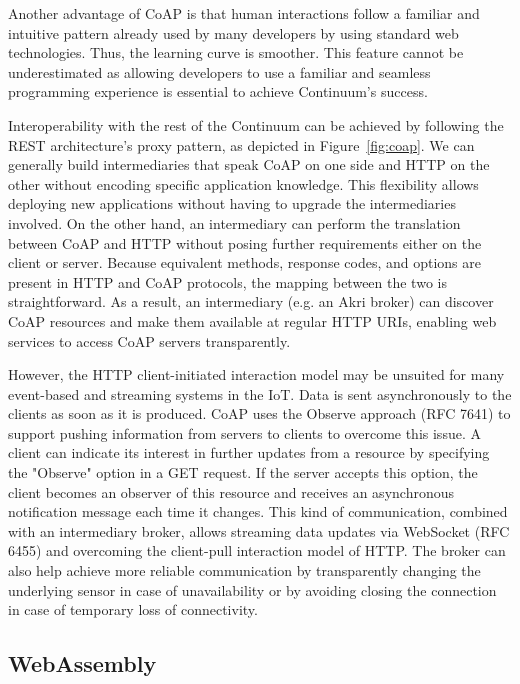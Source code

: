 Another advantage of CoAP is that human interactions follow a familiar and intuitive pattern already used by many developers by using standard web technologies. Thus, the learning curve is smoother. This feature cannot be underestimated as allowing developers to use a familiar and seamless programming experience is essential to achieve Continuum's success.

Interoperability with the rest of the Continuum can be achieved by following the REST architecture's proxy pattern, as depicted in Figure~\ref{fig:coap}. We can generally build intermediaries that speak CoAP on one side and HTTP on the other without encoding specific application knowledge. This flexibility allows deploying new applications without having to upgrade the intermediaries involved. On the other hand, an intermediary can perform the translation between CoAP and HTTP without posing further requirements either on the client or server. Because equivalent methods, response codes, and options are present in HTTP and CoAP protocols, the mapping between the two is straightforward. As a result, an intermediary (e.g. an Akri broker) can discover CoAP resources and make them available at regular HTTP URIs, enabling web services to access CoAP servers transparently.

However, the HTTP client-initiated interaction model may be unsuited for many event-based and streaming systems in the IoT. Data is sent asynchronously to the clients as soon as it is produced. CoAP uses the Observe approach (RFC 7641) to support pushing information from servers to clients to overcome this issue. A client can indicate its interest in further updates from a resource by specifying the "Observe" option in a GET request. If the server accepts this option, the client becomes an observer of this resource and receives an asynchronous notification message each time it changes. This kind of communication, combined with an intermediary broker, allows streaming data updates via WebSocket (RFC 6455) and overcoming the client-pull interaction model of HTTP. The broker can also help achieve more reliable communication by transparently changing the underlying sensor in case of unavailability or by avoiding closing the connection in case of temporary loss of connectivity.

\subsection{WebAssembly}
\label{sec:webassembly}


